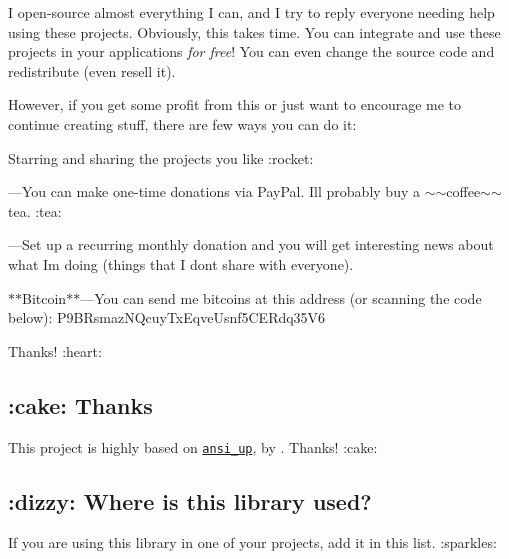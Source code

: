 I open-\/source almost everything I can, and I try to reply everyone needing help using these projects. Obviously, this takes time. You can integrate and use these projects in your applications {\itshape for free}! You can even change the source code and redistribute (even resell it).

However, if you get some profit from this or just want to encourage me to continue creating stuff, there are few ways you can do it\+:


\begin{DoxyItemize}
\item Starring and sharing the projects you like \+:rocket\+:
\item \href{https://www.paypal.com/cgi-bin/webscr?cmd=_s-xclick&hosted_button_id=RVXDDLKKLQRJW}{\tt }—\+You can make one-\/time donations via Pay\+Pal. I\textquotesingle{}ll probably buy a $\sim$$\sim$coffee$\sim$$\sim$ tea. \+:tea\+:
\item \href{https://www.patreon.com/ionicabizau}{\tt }—\+Set up a recurring monthly donation and you will get interesting news about what I\textquotesingle{}m doing (things that I don\textquotesingle{}t share with everyone).
\item $\ast$$\ast$\+Bitcoin$\ast$$\ast$—\+You can send me bitcoins at this address (or scanning the code below)\+: {\+P9\+B\+Rsmaz\+N\+Qcuy\+Tx\+Eqve\+Usnf5\+C\+E\+Rdq35\+V6}


\end{DoxyItemize}

Thanks! \+:heart\+:

\subsection*{\+:cake\+: Thanks}

This project is highly based on \href{https://github.com/drudru/ansi_up}{\tt {\ttfamily ansi\+\_\+up}}, by \href{https://github.com/drudru/}{\tt }. Thanks! \+:cake\+:

\subsection*{\+:dizzy\+: Where is this library used?}

If you are using this library in one of your projects, add it in this list. \+:sparkles\+:


